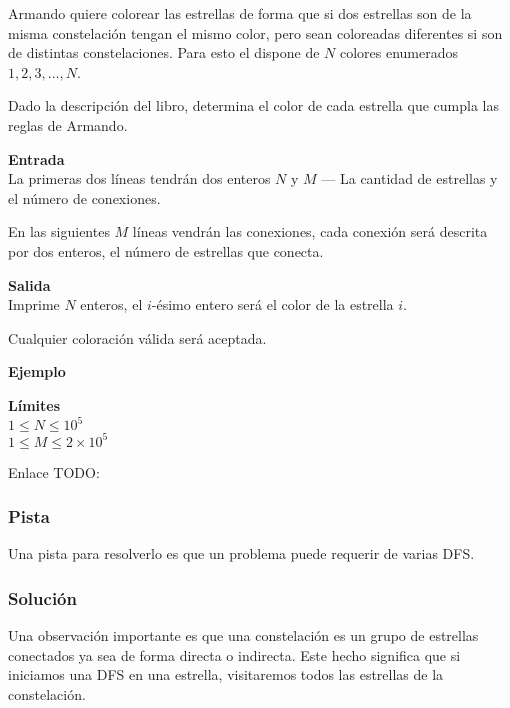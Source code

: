 Armando quiere colorear las estrellas de forma que si dos estrellas son de la misma constelación tengan el mismo color, pero sean coloreadas diferentes si son de distintas constelaciones. Para esto el dispone de \(N\) colores enumerados \(1, 2, 3, \ldots, N\).

Dado la descripción del libro, determina el color de cada estrella que cumpla las reglas de Armando.

\textbf{Entrada}\\
La primeras dos líneas tendrán dos enteros \(N\) y \(M\) --- La cantidad de estrellas y el número de conexiones.

En las siguientes \(M\) líneas vendrán las conexiones, cada conexión será descrita por dos enteros, el número de estrellas que conecta.

\textbf{Salida}\\
Imprime \(N\) enteros, el \(i\)-ésimo entero será el color de la estrella \(i\).

Cualquier coloración válida será aceptada.

\textbf{Ejemplo}\\
\begin{casebox3}
\end{casebox3}

\textbf{Límites}\\
\(1\leq N \leq 10^5\)\\
\(1\leq M \leq 2\times 10^5\)

Enlace TODO:

\pagebreak

\subsubsection*{Pista}
Una pista para resolverlo es que un problema puede requerir de varias DFS.


\subsubsection*{Solución}
Una observación importante es que una constelación es un grupo de estrellas conectados ya sea de forma directa o indirecta. Este hecho significa que si iniciamos una DFS en una estrella, visitaremos todos las estrellas de la constelación.

